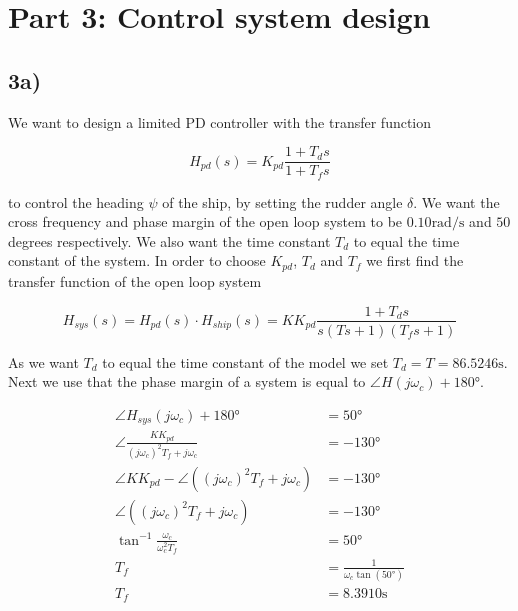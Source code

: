 
\section{Part 3: Control system design}

\subsection{3a)}

We want to design a limited PD controller with the transfer function

\begin{equation}
    H_{pd}(s) = K_{pd}\frac{1+T_ds}{1+T_fs} \label{eq:H_pd}
\end{equation}

to control the heading $\psi$ of the ship, by setting the rudder angle $\delta$. We want the cross frequency and phase margin of the open loop system to be $0.10\si{\radian\per\second}$ and $50$ degrees respectively. We also want the time constant $T_d$ to equal the time constant of the system. In order to choose $K_{pd}$, $T_d$ and $T_f$ we first find the transfer function of the open loop system

\begin{equation}
    H_{sys}(s) = H_{pd}(s) \cdot H_{ship}(s) = KK_{pd}\frac{1+T_ds}{s(Ts+1)(T_fs+1)} \label{eq:H_sys}
\end{equation}

As we want $T_d$ to equal the time constant of the model we set $T_d = T = 86.5246 \si{\second}$. Next we use that the phase margin of a system is equal to $\angle H(j\omega_c) + 180 \si{\degree}$.

\begin{subequations}
    \begin{align}
        \angle H_{sys}(j\omega_c) + 180 \si{\degree} &= 50 \si{\degree} \\
        \angle \frac{KK_{pd}}{(j\omega_c)^2T_f+j\omega_c} &= -130 \si{\degree}\\
        \angle KK_{pd} - \angle ((j\omega_c)^2T_f+j\omega_c) &= -130 \si{\degree} \\
        \angle ((j\omega_c)^2T_f+j\omega_c) &= -130\si{\degree} \\
        \tan^{-1}\frac{\omega_c}{\omega_c^2T_f} &= 50 \si{\degree} \\
        T_f &= \frac{1}{ \omega_c \tan (50 \si{\degree}) } \\
        T_f &= 8.3910 \si{\second} \label{eq:T_f}
    \end{align}
\end{subequations}

